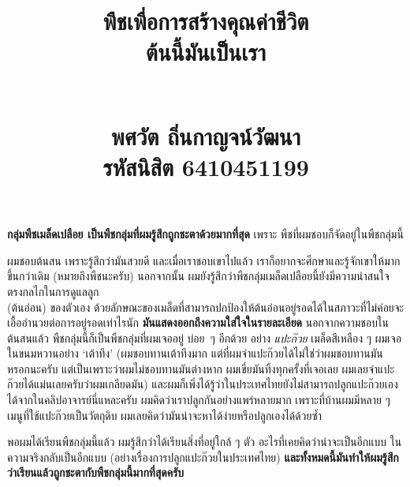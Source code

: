 \documentclass{article}
\title{\flushleft\Large พืชเพื่อการสร้างคุณค่าชีวิต\\
\Huge\textbf{ต้นนี้มันเป็นเรา}\\
\rule{0em}{1ex}\\
\normalsize พศวัต ถิ่นกาญจน์วัฒนา\\
รหัสนิสิต 6410451199
\vspace{-8ex}}
\author{}
\date{}
\begin{document}
\maketitle
\sloppy\flushleft
\textbf{กลุ่มพืชเมล็ดเปลือย เป็นพืชกลุ่มที่ผมรู้สึกถูกชะตาด้วยมากที่สุด} เพราะ พืชที่ผมชอบก็จัดอยู่ในพืชกลุ่มนี้

\rule{0em}{1ex}

ผมชอบต้นสน เพราะรู้สึกว่ามันสวยดี และเมื่อเราชอบเขาไปแล้ว เราก็อยากจะศึกษาและรู้จักเขาให้มากขึ้นกว่าเดิม (หมายถึงพืชนะครับ)
นอกจากนั้น ผมยังรู้สึกว่าพืชกลุ่มเมล็ดเปลือยนี้ยังมีความน่าสนใจตรงกลไกในการดูแลลูก\\
(ต้นอ่อน) ของตัวเอง ด้วยลักษณะของเมล็ดที่สามารถปกป้องให้ต้นอ่อนอยู่รอดได้ในสภาวะที่ไม่ค่อยจะเอื้ออำนวยต่อการอยู่รอดเท่าไรนัก
\textbf{มันแสดงออกถึงความใส่ใจในรายละเอียด} นอกจากความชอบในต้นสนแล้ว พืชกลุ่มนี้ก็เป็นพืชกลุ่มที่ผมเจออยู่ \mbox{บ่อย ๆ} อีกด้วย
อย่าง \textit{แปะก๊วย} เมล็ดสีเหลือง ๆ ผมเจอในขนมหวานอย่าง `เต้าทึง' (ผมชอบทานเต้าทึงมาก แต่ที่ผมจำแปะก๊วยได้ไม่ใช่ว่าผมชอบทานมันหรอกนะครับ
แต่เป็นเพราะว่าผมไม่ชอบทานมัน\mbox{ต่างหาก} ผมเขี่ยมันทิ้งทุกครั้งที่เจอเลย ผมเลยจำแปะก๊วยได้แม่นเลยครับว่าผมเกลียดมัน)
และผมก็เพิ่งได้รู้ว่าในประเทศไทยยังไม่สามารถปลูกแปะก๊วยเองได้จากในคลิปอาจารย์นี่แหละครับ ผมคิดว่าเราปลูกกันอย่างแพร่หลายมาก
เพราะที่บ้านผมมีหลาย ๆ เมนูที่ใช้แปะก๊วยเป็นวัตถุดิบ ผมเลยคิดว่ามันน่าจะหาได้ง่ายหรือปลูกเองได้ด้วยซ้ำ

\rule{0em}{1ex}

พอผมได้เรียนพืชกลุ่มนี้แล้ว ผมรู้สึกว่าได้เรียนสิ่งที่อยู่ใกล้ ๆ ตัว อะไรที่เคยคิดว่าน่าจะเป็นอีกแบบ ในความจริงกลับเป็นอีกแบบ (อย่างเรื่องการปลูกแปะก๊วยในประเทศไทย)
\textbf{และทั้งหมดนี้มันทำให้ผมรู้สึกว่าเรียนแล้วถูกชะตากับ\mbox{พืชกลุ่มนี้}มากที่สุดครับ}
\end{document}
